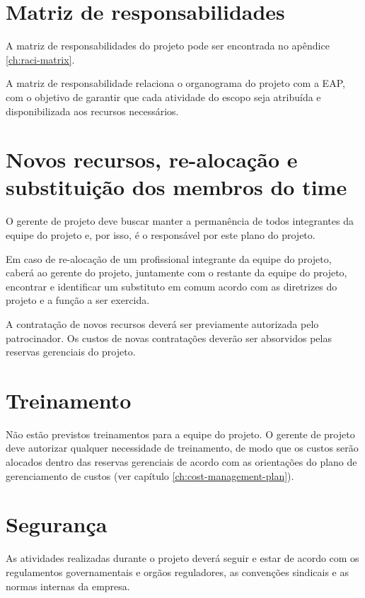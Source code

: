 \section{Matriz de responsabilidades}

A matriz de responsabilidades do projeto pode ser encontrada no apêndice \ref{ch:raci-matrix}.

A matriz de responsabilidade relaciona o organograma do projeto com a EAP, com o objetivo de garantir que cada atividade do escopo seja atribuída e disponibilizada aos recursos necessários.

\section{Novos recursos, re-alocação e substituição dos membros do time}

O gerente de projeto deve buscar manter a permanência de todos integrantes da equipe do projeto e, por isso, é o responsável por este plano do projeto.

Em caso de re-alocação de um profissional integrante da equipe do projeto, caberá ao gerente do projeto, juntamente com o restante da equipe do projeto, encontrar e identificar um substituto em comum acordo com as diretrizes do projeto e a função a ser exercida.

A contratação de novos recursos deverá ser previamente autorizada pelo patrocinador. Os custos de novas contratações deverão ser absorvidos pelas reservas gerenciais do projeto.

\section{Treinamento}

Não estão previstos treinamentos para a equipe do projeto. O gerente de projeto deve autorizar qualquer necessidade de treinamento, de modo que os custos serão alocados dentro das reservas gerenciais de acordo com as orientações do plano de gerenciamento de custos (ver capítulo \ref{ch:cost-management-plan}).

\section{Segurança}

As atividades realizadas durante o projeto deverá seguir e estar de acordo com os regulamentos governamentais e orgãos reguladores, as convenções sindicais e as normas internas da empresa.

